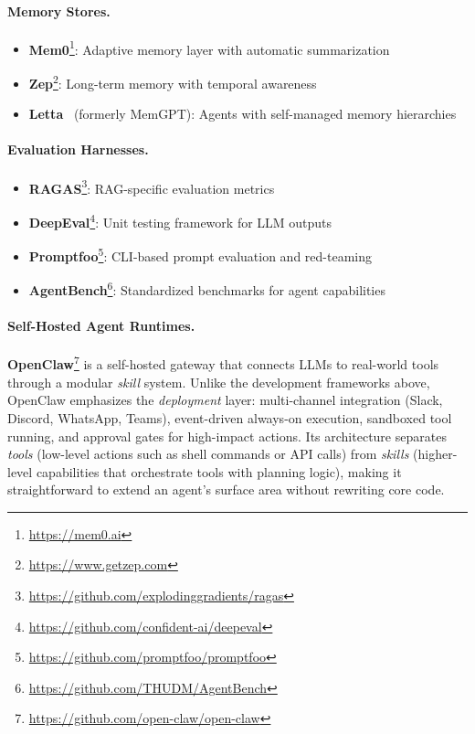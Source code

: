 \paragraph{Memory Stores.}
\label{memory-stores.}

\begin{itemize}
  \item \textbf{Mem0}\footnote{\url{https://mem0.ai}}: Adaptive memory layer with automatic summarization
  \item \textbf{Zep}\footnote{\url{https://www.getzep.com}}: Long-term memory with temporal awareness
  \item \textbf{Letta}~\cite{packer2023memgpt} (formerly MemGPT): Agents with self-managed memory hierarchies
\end{itemize}

\paragraph{Evaluation Harnesses.}
\label{evaluation-harnesses.}

\begin{itemize}
  \item \textbf{RAGAS}\footnote{\url{https://github.com/explodinggradients/ragas}}: RAG-specific evaluation metrics
  \item \textbf{DeepEval}\footnote{\url{https://github.com/confident-ai/deepeval}}: Unit testing framework for LLM outputs
  \item \textbf{Promptfoo}\footnote{\url{https://github.com/promptfoo/promptfoo}}: CLI-based prompt evaluation and red-teaming
  \item \textbf{AgentBench}\footnote{\url{https://github.com/THUDM/AgentBench}}: Standardized benchmarks for agent capabilities
\end{itemize}

\paragraph{Self-Hosted Agent Runtimes.}
\label{self-hosted-agent-runtimes.}

\textbf{OpenClaw}\footnote{\url{https://github.com/open-claw/open-claw}} is a self-hosted gateway that connects LLMs to real-world tools through a modular \emph{skill} system. Unlike the development frameworks above, OpenClaw emphasizes the \emph{deployment} layer: multi-channel integration (Slack, Discord, WhatsApp, Teams), event-driven always-on execution, sandboxed tool running, and approval gates for high-impact actions. Its architecture separates \emph{tools} (low-level actions such as shell commands or API calls) from \emph{skills} (higher-level capabilities that orchestrate tools with planning logic), making it straightforward to extend an agent’s surface area without rewriting core code.

